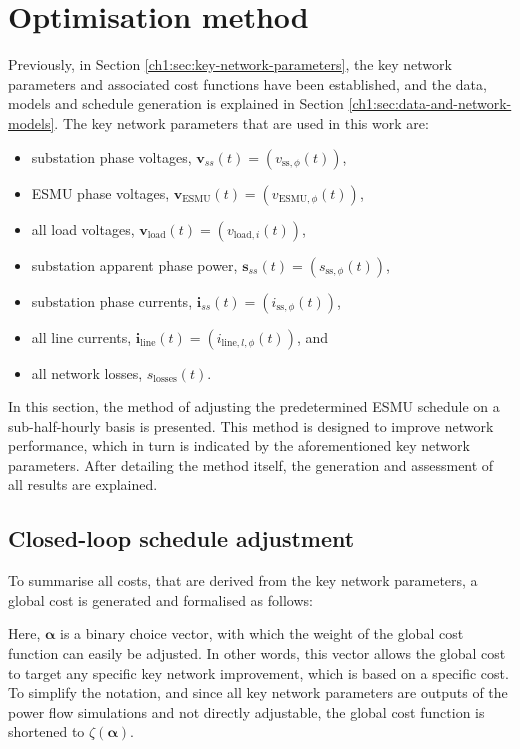 \section{Optimisation method}
\label{ch1:sec:closed-loop-optimisation-method}

Previously, in Section \ref{ch1:sec:key-network-parameters}, the key network parameters and associated cost functions have been established, and the data, models and schedule generation is explained in Section \ref{ch1:sec:data-and-network-models}.
The key network parameters that are used in this work are:

\begin{itemize}
	\item substation phase voltages, $\textbf{v}_{ss}(t) = (v_{\text{ss},\phi}(t))$,
	\item ESMU phase voltages, $\textbf{v}_\text{ESMU}(t) = (v_{\text{ESMU},\phi}(t))$,
	\item all load voltages, $\textbf{v}_\text{load}(t) = (v_{\text{load},i}(t))$,
	\item substation apparent phase power, $\textbf{s}_{ss}(t) = (s_{\text{ss},\phi}(t))$,
	\item substation phase currents, $\textbf{i}_{ss}(t) = (i_{\text{ss},\phi}(t))$,
	\item all line currents, $\textbf{i}_\text{line}(t) = (i_{\text{line},l,\phi}(t))$, and
	\item all network losses, $s_\text{losses}(t)$.
\end{itemize}

In this section, the method of adjusting the predetermined ESMU schedule on a sub-half-hourly basis is presented.
This method is designed to improve network performance, which in turn is indicated by the aforementioned key network parameters.
After detailing the method itself, the generation and assessment of all results are explained. 

\subsection{Closed-loop schedule adjustment}

To summarise all costs, that are derived from the key network parameters, a global cost is generated and formalised as follows:



Here, $\boldsymbol{\alpha}$ is a binary choice vector, with which the weight of the global cost function can easily be adjusted.
In other words, this vector allows the global cost to target any specific key network improvement, which is based on a specific cost.
To simplify the notation, and since all key network parameters are outputs of the power flow simulations and not directly adjustable, the global cost function is shortened to $\zeta(\boldsymbol{\alpha})$.

